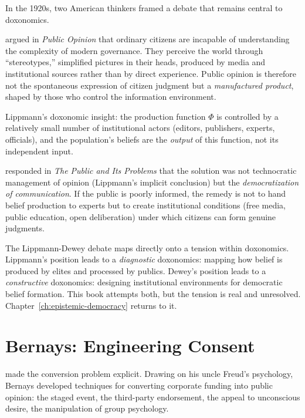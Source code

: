 In the 1920s, two American thinkers framed a debate that remains central to doxonomics.

\textcite{lippmann1922} argued in \textit{Public Opinion} that ordinary citizens are incapable of understanding the complexity of modern governance.
They perceive the world through ``stereotypes,'' simplified pictures in their heads, produced by media and institutional sources rather than by direct experience.
Public opinion is therefore not the spontaneous expression of citizen judgment but a \emph{manufactured product}, shaped by those who control the information environment.

Lippmann's doxonomic insight: the production function $\Phi$ is controlled by a relatively small number of institutional actors (editors, publishers, experts, officials), and the population's beliefs are the \emph{output} of this function, not its independent input.

\textcite{dewey1927} responded in \textit{The Public and Its Problems} that the solution was not technocratic management of opinion (Lippmann's implicit conclusion) but the \emph{democratization of communication}.
If the public is poorly informed, the remedy is not to hand belief production to experts but to create institutional conditions (free media, public education, open deliberation) under which citizens can form genuine judgments.

\begin{remark}
The Lippmann-Dewey debate maps directly onto a tension within doxonomics.
Lippmann's position leads to a \emph{diagnostic} doxonomics: mapping how belief is produced by elites and processed by publics.
Dewey's position leads to a \emph{constructive} doxonomics: designing institutional environments for democratic belief formation.
This book attempts both, but the tension is real and unresolved.
Chapter~\ref{ch:epistemic-democracy} returns to it.
\end{remark}


\section{Bernays: Engineering Consent}
\label{sec:ch3-bernays}

\textcite{bernays1928} made the conversion problem explicit.
Drawing on his uncle Freud's psychology, Bernays developed techniques for converting corporate funding into public opinion: the staged event, the third-party endorsement, the appeal to unconscious desire, the manipulation of group psychology.

